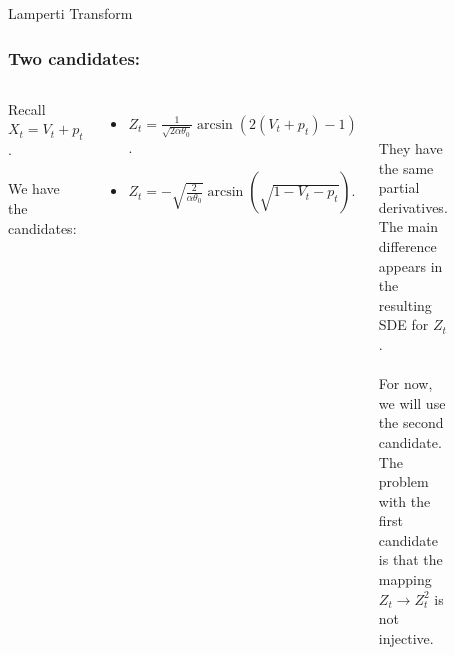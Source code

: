\documentclass[aspectratio=169]{beamer}\usepackage[utf8]{inputenc}
\begin{document}

\begin{frame}

{\Huge Lamperti Transform}

\end{frame}


\begin{frame}\frametitle{Two candidates:}

\begin{columns}

Recall $X_t=V_t+p_t$.\\
\quad\\
We have the candidates:
\begin{itemize}

\item {\color{blue} $Z_t=\frac{1}{\sqrt{2\alpha\theta_0}}\arcsin(2(V_t+p_t)-1)$.}
\item {\color{red} $Z_t=-\sqrt{\frac{2}{\alpha\theta_0}}\arcsin(\sqrt{1-V_t-p_t})$.}

\end{itemize}
\quad\\
\quad\\
They have the same partial derivatives. The main difference appears in the resulting SDE for $Z_t$.\\
\quad\\
For now, we will use the {\color{red}second candidate}. The problem with the {\color{blue} first candidate} is that the mapping $Z_t\to Z_t^2$ is not injective.

\begin{figure}[ht!]
\centering
\includegraphics[width=0.9\textwidth]{../../Mathematica_Files/new_model/Lamp_Comp.pdf}
\end{figure}

\end{columns}

\end{frame}
\end{document}
